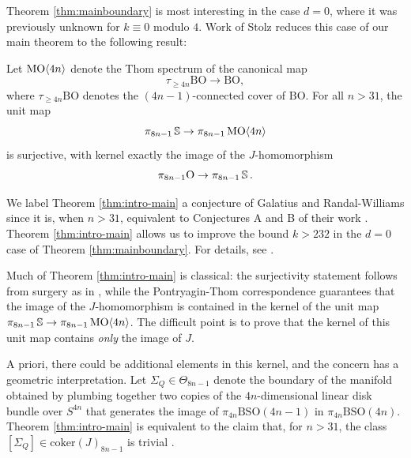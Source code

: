 Theorem \ref{thm:mainboundary} is most interesting in the case $d=0$, where it was previously unknown for $k \equiv 0$ modulo $4$.
Work of Stolz \cite[Lemma 12.5]{StolzBook} reduces this case of our main theorem to the following result:

\begin{thm} \label{thm:intro-main}
Let $\operatorname{\mathrm{MO}} \langle 4n \rangle$ denote the Thom spectrum of the canonical map
$$\tau_{\ge 4n} \mathrm{BO} \to \mathrm{BO},$$
where $\tau_{\ge 4n} \mathrm{BO}$ denotes the $(4n-1)$-connected cover of $\mathrm{BO}$.
For all $n>31$, the unit map
$$\pi_{8n-1} \operatorname{\mathbb{S}} \to \pi_{8n-1} \operatorname{\mathrm{MO}}\langle 4n \rangle$$
is surjective, with kernel exactly the image of the $J$-homomorphism
$$\pi_{8n-1} \mathrm{O} \to \pi_{8n-1} \operatorname{\mathbb{S}}.$$
\end{thm}

We label Theorem \ref{thm:intro-main} a conjecture of Galatius and Randal-Williams since it is, when $n>31$, equivalent to Conjectures A and B of their work \cite{GRAbelianQuotients}.
Theorem \ref{thm:intro-main} allows us to improve the bound $k>232$ in the $d=0$ case of Theorem \ref{thm:mainboundary}.  For details, see .

\begin{rmk} \label{rmk:Qdef}
Much of Theorem \ref{thm:intro-main} is classical: the surjectivity statement follows from surgery as in \cite[Theorem 6.6]{KervaireMilnor}, while the Pontryagin-Thom correspondence guarantees that the image of the $J$-homomorphism is contained in the kernel of the unit map $\pi_{8n-1} \operatorname{\mathbb{S}} \to \pi_{8n-1} \operatorname{\mathrm{MO}}\langle 4n\rangle$.  The difficult point is to prove that the kernel of this unit map contains \emph{only} the image of $J$.

A priori, there could be additional elements in this kernel, and the concern has a geometric interpretation.  Let $\Sigma_Q \in \Theta_{8n-1}$ denote the boundary of the manifold obtained by plumbing together two copies of the $4n$-dimensional linear disk bundle over $S^{4n}$ that generates the image of $\pi_{4n} \mathrm{BSO}(4n-1)$ in $\pi_{4n}\mathrm{BSO}(4n)$. Theorem \ref{thm:intro-main} is equivalent to the claim that, for $n>31$, the class $[\Sigma_Q] \in \mathrm{coker}(J)_{8n-1}$ is trivial \cite[Lemma 10.3]{StolzBook}.
\end{rmk}

